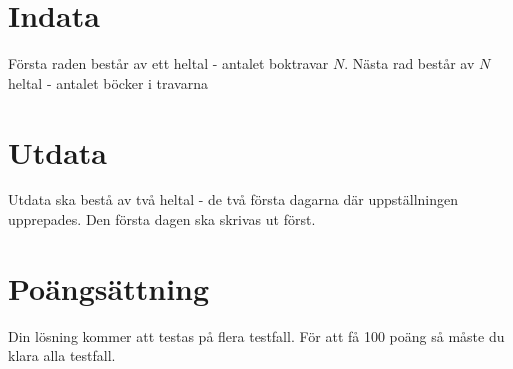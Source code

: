\section*{Indata}
Första raden består av ett heltal - antalet boktravar $N$.
Nästa rad består av $N$ heltal - antalet böcker i travarna

\section*{Utdata}
Utdata ska bestå av två heltal - de två första dagarna där uppställningen upprepades. Den första dagen ska skrivas ut först.


\section*{Poängsättning}
Din lösning kommer att testas på flera testfall. För att få 100 poäng så måste du klara alla testfall.

